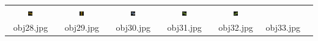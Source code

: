 \begin{table}[H]
\begin{tabu}{|ccccccc|}
    \includegraphics[width=0.1\textwidth,height=0.1\textwidth]{imagens/coil_100/caixas/obj84__45.png} &
    \includegraphics[width=0.1\textwidth,height=0.1\textwidth]{imagens/coil_100/caixas/obj84__45_1.png} &
    \includegraphics[width=0.1\textwidth,height=0.1\textwidth]{imagens/coil_100/caixas/obj96__45.png} &
    \includegraphics[width=0.1\textwidth,height=0.1\textwidth]{imagens/coil_100/caixas/obj98__55.png} &
    \includegraphics[width=0.1\textwidth,height=0.1\textwidth]{imagens/coil_100/caixas/obj98__55_1.png} &
    \\
    \scriptsize{obj28.jpg} & \scriptsize{obj29.jpg} & \scriptsize{obj30.jpg} &
    \scriptsize{obj31.jpg} & \scriptsize{obj32.jpg} & \scriptsize{obj33.jpg} &
  \end{tabu}
\end{table}


